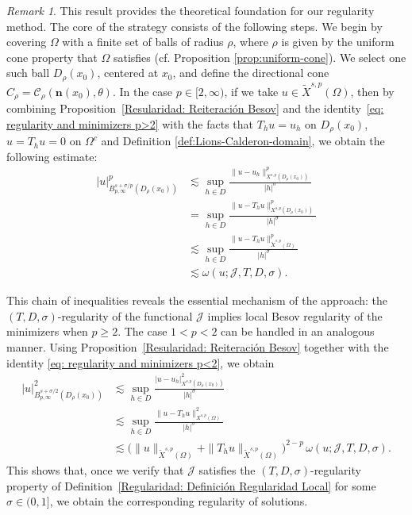 \documentclass[]{amsart}
\theoremstyle{definition}
\theoremstyle{definition}
\theoremstyle{remark}
\newtheorem{remark}[theorem]{Remark}
\numberwithin{equation}{section}
\begin{document}
	\begin{remark}
	    This result provides the theoretical foundation for our regularity method. The core of the strategy consists of the following steps.
%
	We begin by covering $\Omega$ with a finite set of balls of radius $\rho$, where $\rho$ is given by the uniform cone property that $\Omega$ satisfies (cf. Proposition \ref{prop:uniform-cone}).
    We select one such ball  \( D_\rho(x_0)\), centered at \( x_0\), and define the directional cone \( C_\rho = \mathcal{C}_\rho(\mathbf{n}(x_0), \theta) \). In the case \( p \in [2, \infty) \), if we take \( u \in \widetilde{X}^{s,p}(\Omega) \), then by combining Proposition~\ref{Resularidad: Reiteración Besov} and the identity~\eqref{eq: regularity and minimizers p>2} with the facts that \( T_h u = u_h \) on \( D_\rho(x_0) \), $u = T_h u = 0$ on $\Omega^c$ and Definition \ref{def:Lions-Calderon-domain},
     we obtain the following estimate:
	\begin{equation} \label{eq:reg-functional-pge2}
	\begin{aligned}
		|u|_{B_{p,\infty}^{s + \sigma/p}(D_\rho(x_0))}^p 
		& \lesssim \sup_{h \in D} \frac{\|u - u_h\|_{X^{s,p}(D_\rho(x_0))}^p }{ |h|^\sigma } \\
		& = \sup_{h \in D} \frac{ \| u - T_h u \|_{X^{s,p}(D_\rho(x_0))}^p}{ |h|^\sigma }\\
        &\lesssim \sup_{h \in D} \frac{ \| u - T_h u \|_{\widetilde{X}^{s,p}(\Omega)}^p}{ |h|^\sigma }\\
		& \lesssim \omega(u; \mathcal{J}, T, D, \sigma).
	\end{aligned}
	\end{equation}
    
	
	This chain of inequalities reveals the essential mechanism of the approach: the \((T, D, \sigma)\)-regularity of the functional \( \mathcal{J} \) implies local Besov regularity of the minimizers when \( p \geq 2 \). The case \( 1<p<2 \) can be handled in an analogous manner. Using 
	Proposition~\ref{Resularidad: Reiteración Besov} together with the identity 
	\eqref{eq: regularity and minimizers p<2}, we obtain
	\begin{equation} 
		\label{eq:reg-functional-p<2}
		\begin{aligned}
			|u|_{B_{p,\infty}^{s+\sigma/2}(D_\rho(x_0))}^{2} 
			&\lesssim\sup_{h \in D} \frac{|u - u_h|_{X^{s,p}(D_\rho(x_0))}^{2}}{|h|^\sigma} \\
			&\lesssim\sup_{h \in D} \frac{\|u - T_h u\|_{X^{s,p}(\Omega)}^{2}}{|h|^\sigma} \\
			&\lesssim \bigl(\|u\|_{\widetilde{X}^{s,p}(\Omega)} 
			+\|T_h u\|_{\widetilde{X}^{s,p}(\Omega)}\bigr)^{2-p}
			\,\omega(u; \mathcal{J}, T, D, \sigma).
		\end{aligned}
	\end{equation}
	This shows that, once we verify that \( \mathcal{J} \) satisfies  the \((T, D, \sigma)\)-regularity property of Definition~\ref{Regularidad: Definición Regularidad Local} for some \( \sigma \in (0,1] \), we obtain the corresponding  regularity of solutions.
	\end{remark}
	
\end{document}

